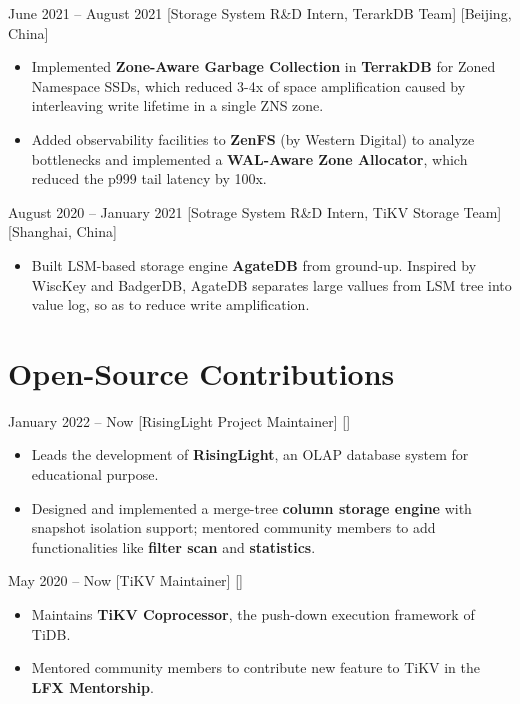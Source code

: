 \documentclass{chicv}
\begin{document}
  {June 2021 – August 2021}
  [Storage System R\&D Intern, TerarkDB Team]
  [Beijing, China]

\begin{itemize}
  \item Implemented \textbf{Zone-Aware Garbage Collection} in \textbf{TerrakDB} for Zoned Namespace SSDs, which reduced 3-4x of space amplification caused by interleaving write lifetime in a single ZNS zone.
  \item Added observability facilities to \textbf{ZenFS} (by Western Digital) to analyze bottlenecks and implemented a \textbf{WAL-Aware Zone Allocator}, which reduced the p999 tail latency by 100x.
\end{itemize}

  {August 2020 -- January 2021}
  [Sotrage System R\&D Intern, TiKV Storage Team][Shanghai, China]
  \begin{itemize}
    \item Built LSM-based storage engine \textbf{AgateDB} from ground-up. Inspired by WiscKey and BadgerDB, AgateDB separates large vallues from LSM tree into value log, so as to reduce write amplification.
  \end{itemize}

\section{Open-Source Contributions}

  {January 2022 -- Now}
  [RisingLight Project Maintainer]
  []
  \begin{itemize}
    \item Leads the development of \textbf{RisingLight}, an OLAP database system for educational purpose.
    \item Designed and implemented a merge-tree \textbf{column storage engine} with snapshot isolation support; mentored community members to add functionalities like \textbf{filter scan} and \textbf{statistics}.
  \end{itemize}

    {May 2020 -- Now}
    [TiKV Maintainer]
    [] %
    \begin{itemize}
      \item Maintains \textbf{TiKV Coprocessor}, the push-down execution framework of TiDB.
      \item Mentored community members to contribute new feature to TiKV in the \textbf{LFX Mentorship}. \ 
    \end{itemize}
\end{document}
